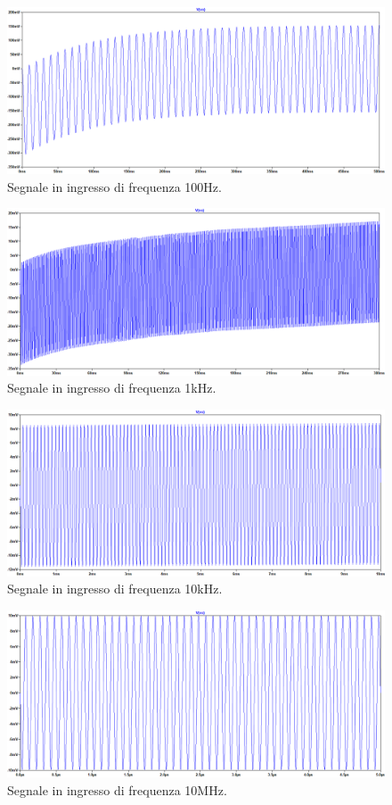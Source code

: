 \documentclass[a4paper,10pt]{article}
\begin{document}
\begin{figure}[h!]
	\centering
 	\includegraphics[width=1\linewidth]{plot3-100.png}
  	\caption{Segnale in ingresso di frequenza 100Hz.}
  	\label{fig:out100}
\end{figure}
\begin{figure}[h!]
	\centering
 	\includegraphics[width=1\linewidth]{plot3-1k.png}
  	\caption{Segnale in ingresso di frequenza 1kHz.}
  	\label{fig:out1k}
\end{figure}
\begin{figure}[h!]
	\centering
 	\includegraphics[width=1\linewidth]{plot3-10k.png}
  	\caption{Segnale in ingresso di frequenza 10kHz.}
  	\label{fig:out100k}
\end{figure}
\begin{figure}[h!]
	\centering
 	\includegraphics[width=1\linewidth]{plot3-10M.png}
  	\caption{Segnale in ingresso di frequenza 10MHz.}
  	\label{fig:out10meg}
\end{figure}
\end{document}
